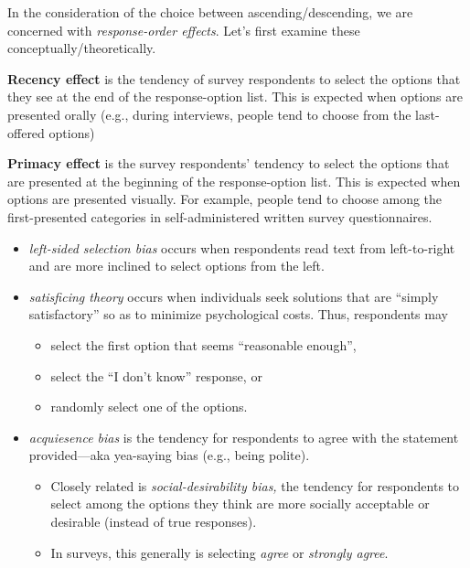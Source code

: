 \documentclass[
  english,
]{book}
\providecommand{\tightlist}{%
  \setlength{\itemsep}{0pt}\setlength{\parskip}{0pt}}
\begin{document}
In the consideration of the choice between ascending/descending, we are concerned with \emph{response-order effects}. Let's first examine these conceptually/theoretically.

\textbf{Recency effect} is the tendency of survey respondents to select the options that they see at the end of the response-option list. This is expected when options are presented orally (e.g., during interviews, people tend to choose from the last-offered options)

\textbf{Primacy effect} is the survey respondents' tendency to select the options that are presented at the beginning of the
response-option list. This is expected when options are presented visually. For example, people tend to choose among the first-presented categories in self-administered written survey questionnaires.

\begin{itemize}
\tightlist
\item
  \emph{left-sided selection bias} occurs when respondents read text from left-to-right and are more inclined to select options from the left.
\item
  \emph{satisficing theory} occurs when individuals seek solutions that are ``simply satisfactory'' so as to minimize psychological costs. Thus, respondents may

  \begin{itemize}
  \tightlist
  \item
    select the first option that seems ``reasonable enough'',
  \item
    select the ``I don't know'' response, or
  \item
    randomly select one of the options.
  \end{itemize}
\item
  \emph{acquiesence bias} is the tendency for respondents to agree with the statement provided---aka yea-saying bias (e.g., being polite).

  \begin{itemize}
  \tightlist
  \item
    Closely related is \emph{social-desirability bias,} the tendency for respondents to select among the options they think are more socially acceptable or desirable (instead of true responses).
  \item
    In surveys, this generally is selecting \emph{agree} or \emph{strongly agree}.
  \end{itemize}
\end{itemize}
\end{document}
